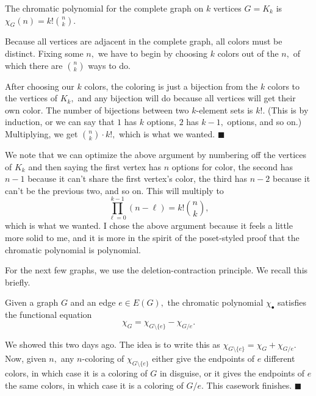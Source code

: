 \begin{proposition}
    The chromatic polynomial for the complete graph on $k$ vertices $G=K_k$ is $\chi_G(n)=k!\binom nk.$
\end{proposition}
Because all vertices are adjacent in the complete graph, all colors must be distinct. Fixing some $n,$ we have to begin by choosing $k$ colors out of the $n,$ of which there are $\binom nk$ ways to do.

After choosing our $k$ colors, the coloring is just a bijection from the $k$ colors to the vertices of $K_k,$ and any bijection will do because all vertices will get their own color. The number of bijections between two $k$-element sets is $k!.$ (This is by induction, or we can say that $1$ has $k$ options, $2$ has $k-1,$ options, and so on.) Multiplying, we get $\binom nk\cdot k!,$ which is what we wanted. $\blacksquare$

We note that we can optimize the above argument by numbering off the vertices of $K_k$ and then saying the first vertex has $n$ options for color, the second has $n-1$ because it can't share the first vertex's color, the third has $n-2$ because it can't be the previous two, and so on. This will multiply to
\[\prod_{\ell=0}^{k-1}(n-\ell)=k!\binom nk,\]
which is what we wanted. I chose the above argument because it feels a little more solid to me, and it is more in the spirit of the poset-styled proof that the chromatic polynomial is polynomial.

For the next few graphs, we use the deletion-contraction principle. We recall this briefly.
\begin{proposition}
    Given a graph $G$ and an edge $e\in E(G),$ the chromatic polynomial $\chi_\bullet$ satisfies the functional equation
    \[\chi_G=\chi_{G\setminus\{e\}}-\chi_{G/e}.\]
\end{proposition}
We showed this two days ago. The idea is to write this as $\chi_{G\setminus\{e\}}=\chi_G+\chi_{G/e}.$ Now, given $n,$ any $n$-coloring of $\chi_{G\setminus\{e\}}$ either give the endpoints of $e$ different colors, in which case it is a coloring of $G$ in disguise, or it gives the endpoints of $e$ the same colors, in which case it is a coloring of $G/e.$ This casework finishes. $\blacksquare$

